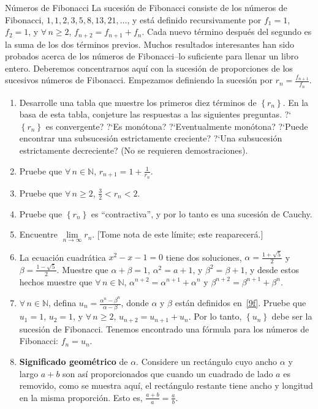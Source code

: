 \begin{prob}{Números de Fibonacci}
	La sucesión de Fibonacci consiste de los números de Fibonacci, $1,1,2,3,5,8,13,21,\ldots$, y está definido recursivamente por $f_{1}=1$, $f_{2}=1$, y $\forall\,n\geq2$, $f_{n+2}=f_{n+1}+f_{n}$. Cada nuevo término después del segundo es la suma de los dos términos previos. Muchos resultados interesantes han sido probados acerca de los números de Fibonacci--lo suficiente para llenar un libro entero. Deberemos concentrarnos aquí con la sucesión de proporciones de los sucesivos números de Fibonacci. Empezamos definiendo la sucesión por $r_{n}=\tfrac{f_{n+1}}{f_{n}}$.
		\begin{enumerate}
			\item Desarrolle una tabla que muestre los primeros diez términos de $\left\{r_{n}\right\}$. En la basa de esta tabla, conjeture las respuestas a las siguientes preguntas. ?`$\left\{r_{n}\right\}$ es convergente? ?`Es monótona? ?`Eventualmente monótona? ?`Puede encontrar una subsucesión estrictamente creciente? ?`Una subsucesión estrictamente decreciente? (No se requieren demostraciones).
			\item Pruebe que $\forall\,n\in\mathds{N}$, $r_{n+1}=1+\tfrac{1}{r_{n}}$.
			\item Pruebe que $\forall\,n\geq2$, $\tfrac{3}{2}<r_{n}<2$.
			\item Pruebe que $\left\{r_{n}\right\}$ es ``contractiva'', y por lo tanto es una sucesión de Cauchy.
			\item Encuentre $\lim\limits_{n\to\infty}r_{n}$. [Tome nota de este límite; este reaparecerá.]
			\item La ecuación cuadrática $x^{2}-x-1=0$ tiene dos soluciones, $\alpha=\frac{1+\sqrt{5}}{2}$ y $\beta=\frac{1-\sqrt{5}}{2}$. Muestre que $\alpha+\beta=1$, $\alpha^{2}=a+1$, y $\beta^{2}=\beta+1$, y desde estos hechos muestre que $\forall\,n\in\mathbb{N}$, $\alpha^{n+2}=\alpha^{n+1}+\alpha^{n}$ y $\beta^{n+2}=\beta^{n+1}+\beta^{n}$.\label{9f}
			\item $\forall\,n\in\mathds{N}$, defina $u_{n}=\frac{\alpha^{n}-\beta^{n}}{\alpha-\beta}$, donde $\alpha$ y $\beta$ están definidos en~\ref{9f}. Pruebe que $u_{1}=1$, $u_{2}=1$, y $\forall\,n\geq2$, $u_{n+2}=u_{n+1}+u_{n}$. Por lo tanto, $\left\{u_{n}\right\}$ debe ser la sucesión de Fibonacci. Tenemos encontrado una fórmula para los números de Fibonacci: $f_{n}=u_{n}$.
			\item \textbf{Significado geométrico} de $\alpha$. Considere un rectángulo cuyo ancho $\alpha$ y largo $a+b$ son así proporcionados que cuando un cuadrado de lado $a$ es removido, como se muestra aquí, el rectángulo restante tiene ancho y longitud en la misma proporción. Esto es, $\tfrac{a+b}{a}=\tfrac{a}{b}$.
	

\end{enumerate}
\end{prob}
